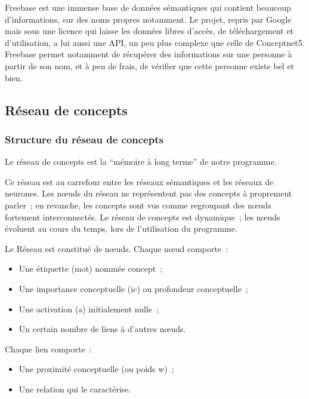 \documentclass[a4paper, 12pt]{article}
\begin{document}
Freebase est une immense base de données sémantiques qui contient beaucoup d'informations, sur des noms propres notamment. Le projet, repris par Google mais sous une licence qui laisse les données libres d'accès, de téléchargement et d'utilisation, a lui aussi une API, un peu plus complexe que celle de Conceptnet5. Freebase permet notamment de récupérer des informations sur une personne à partir de son nom, et à peu de frais, de vérifier que cette personne existe bel et bien.


\subsection{Réseau de concepts}

\subsubsection{Structure du réseau de concepts}

\begin{definition}
Le réseau de concepts est la ``mémoire à long terme'' de notre programme.

Ce réseau est au carrefour entre les réseaux sémantiques et les réseaux de neurones. Les n\oe{}uds du réseau ne représentent pas des concepts à proprement parler~; en revanche, les concepts sont vus comme regroupant des n\oe{}uds fortement interconnectés. Le réseau de concepts est dynamique~; les nœuds évoluent au cours du temps, lors de l'utilisation du programme.
\end{definition}


Le Réseau est constitué de n\oe{}uds. Chaque n\oe{}ud comporte~:
\begin{itemize}
  \item Une étiquette (mot) nommée concept~;
 \item Une importance conceptuelle (ic) ou profondeur conceptuelle~;
 \item Une activation (a) initialement nulle~;
 \item Un certain nombre de liens à d'autres n\oe{}uds.
\end{itemize}

Chaque lien comporte~:
\begin{itemize}
 \item Une proximité conceptuelle (ou poids w)~;
 \item Une relation qui le caractérise.
\end{itemize}
\end{document}
